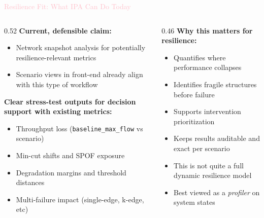 \documentclass[aspectratio=169]{beamer}
\begin{document}
\begin{frame}{\textcolor{pink}{Resilience Fit: What IPA Can Do Today}}
\begin{columns}[T]
\begin{column}{0.52\textwidth}
\textbf{Current, defensible claim:}
\begin{itemize}
\item Network snapshot analysis for potentially resilience-relevant metrics
\item Scenario views in front-end already align with this type of workflow
\end{itemize}

\vspace{0.2cm}
\textbf{Clear stress-test outputs for decision support with existing metrics:}
\begin{itemize}
\item Throughput loss (\texttt{baseline\_max\_flow} vs scenario)
\item Min-cut shifts and SPOF exposure
\item Degradation margins and threshold distances
\item Multi-failure impact (single-edge, k-edge, etc)
\end{itemize}
\end{column}

\begin{column}{0.46\textwidth}
\textbf{Why this matters for resilience:}
\begin{itemize}
\item Quantifies where performance collapses
\item Identifies fragile structures before failure
\item Supports intervention prioritization
\item Keeps results auditable and exact per scenario
\end{itemize}


\begin{tcolorbox}[colback=yellow!10!white,
                  colframe=orange!80!black,
                  title=\textbf{Important Clarification},
                  fonttitle=\bfseries]
\begin{itemize}
\item This is not quite a full dynamic resilience model
\item Best viewed as a \textit{profiler} on system states
\end{itemize}
\end{tcolorbox}
\end{column}
\end{columns}
\end{frame}
\end{document}

